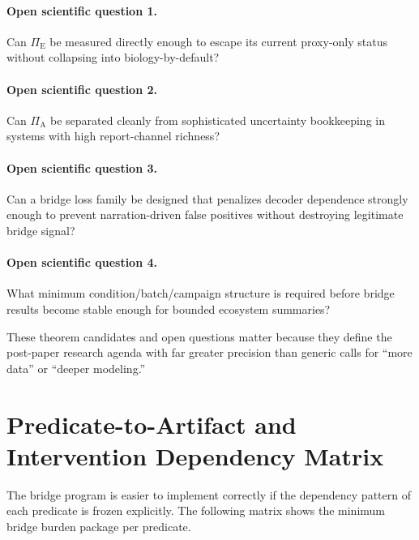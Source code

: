 \documentclass[11pt,a4paper]{article}
\theoremstyle{definition}
\newcommand{\PiA}{\Pi_{\mathrm{A}}}
\newcommand{\PiE}{\Pi_{\mathrm{E}}}
\begin{document}
\paragraph{Open scientific question 1.}
Can $\PiE$ be measured directly enough to escape its current proxy-only status without collapsing into biology-by-default?

\paragraph{Open scientific question 2.}
Can $\PiA$ be separated cleanly from sophisticated uncertainty bookkeeping in systems with high report-channel richness?

\paragraph{Open scientific question 3.}
Can a bridge loss family be designed that penalizes decoder dependence strongly enough to prevent narration-driven false positives without destroying legitimate bridge signal?

\paragraph{Open scientific question 4.}
What minimum condition/\allowbreak batch/\allowbreak campaign structure is required before bridge results become stable enough for bounded ecosystem summaries?

These theorem candidates and open questions matter because they define the post-paper research agenda with far greater precision than generic calls for ``more data'' or ``deeper modeling.''

\section{Predicate-to-Artifact and Intervention Dependency Matrix}
The bridge program is easier to implement correctly if the dependency pattern of each predicate is frozen explicitly. The following matrix shows the minimum bridge burden package per predicate.
\end{document}

